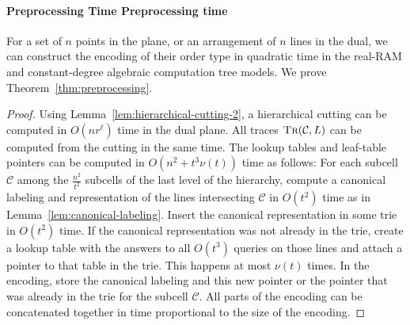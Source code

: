 \paragraph*{\iftitlecase%
Preprocessing Time\else%
Preprocessing time\fi}
For a set of \(n\) points in the plane, or an arrangement of \(n\) lines in the
dual, we can construct the encoding of their order type in quadratic time in
the real-RAM and constant-degree algebraic computation tree models. We prove
Theorem~\ref{thm:preprocessing}. 
\begin{proof}
  Using Lemma~\ref{lem:hierarchical-cutting-2},
  a hierarchical cutting can be computed in \(O(nr^\ell)\) time in the dual
  plane. All traces \(\textsc{Tr}(\mathcal{C}, L)\) can be computed from the cutting
  in the same time. The lookup tables and leaf-table pointers can be computed
  in \(O(n^2 + t^3 \nu(t))\) time as follows: For each subcell \(\mathcal{C}\)
  among the \(\frac{n^2}{t^2}\) subcells of the last level of the hierarchy,
  compute a canonical labeling and representation of the lines intersecting
  \(\mathcal{C}\) in \(O(t^2)\) time as in Lemma~\ref{lem:canonical-labeling}.
  Insert the canonical representation in some trie in \(O(t^2)\)
  time. If the canonical representation was not already in the trie, create a lookup
  table with the answers to all \(O(t^3)\) queries on those lines and attach a
  pointer to that table in the trie. This happens at most \(\nu(t)\) times.
  In the encoding, store the canonical labeling and this new pointer or the
  pointer that was already in the trie for the subcell \(\mathcal{C}\). All
  parts of the encoding can be concatenated together in time proportional to
  the size of the encoding.
\end{proof}
